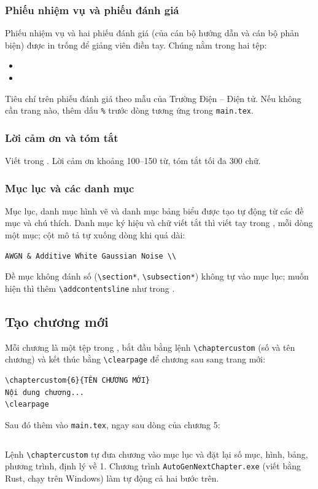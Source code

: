\subsubsection{Phiếu nhiệm vụ và phiếu đánh giá}
Phiếu nhiệm vụ và hai phiếu đánh giá (của cán bộ hướng dẫn và cán bộ phản biện) được in trống để giảng viên điền tay. Chúng nằm trong hai tệp:
\begin{itemize}
    \item {}
    \item {}
\end{itemize} Tiêu chí trên phiếu đánh giá theo mẫu của Trường Điện -- Điện tử. Nếu không cần trang nào, thêm dấu \verb|%| trước dòng \verb|| tương ứng trong \texttt{main.tex}.

\subsubsection{Lời cảm ơn và tóm tắt}
Viết trong . Lời cảm ơn khoảng 100--150 từ, tóm tắt tối đa 300 chữ.

\subsubsection{Mục lục và các danh mục}
Mục lục, danh mục hình vẽ và danh mục bảng biểu được tạo tự động từ các đề mục và chú thích. Danh mục ký hiệu và chữ viết tắt thì viết tay trong , mỗi dòng một mục; cột mô tả tự xuống dòng khi quá dài:
\begin{verbatim}
AWGN & Additive White Gaussian Noise \\
\end{verbatim}
Đề mục không đánh số (\verb|\section*|, \verb|\subsection*|) không tự vào mục lục; muốn hiện thì thêm \verb|\addcontentsline| như trong .

\subsection{Tạo chương mới}
Mỗi chương là một tệp trong , bắt đầu bằng lệnh \verb|\chaptercustom| (số và tên chương) và kết thúc bằng \verb|\clearpage| để chương sau sang trang mới:
\begin{verbatim}
\chaptercustom{6}{TÊN CHƯƠNG MỚI}
Nội dung chương...
\clearpage
\end{verbatim}
Sau đó thêm vào \texttt{main.tex}, ngay sau dòng của chương 5:
\begin{verbatim}

\end{verbatim} Lệnh \verb|\chaptercustom| tự đưa chương vào mục lục và đặt lại số mục, hình, bảng, phương trình, định lý về 1. Chương trình \texttt{AutoGenNextChapter.exe} (viết bằng Rust, chạy trên Windows) làm tự động cả hai bước trên.

